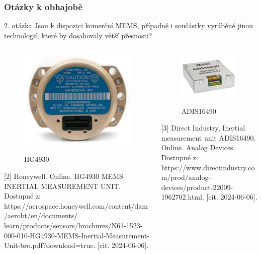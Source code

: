 \documentclass[%
  12pt,       				%
	t,                  %
	aspectratio=1610,   %
	unicode,						%
]{beamer}				    	%
\begin{document}
\begin{frame} 
	\frametitle{Otázky k obhajobě}
		\begin{alertblock}{2. otázka}
		Jsou k dispozici komerční MEMS, případně i součástky vyráběné jinou technologií, které by dosahovaly větší přesnosti?
		\end{alertblock}
		
		\begin{columns}[T] 								%
		\begin{column}{0.5\textwidth}		%
		\begin{figure}%
		\centering
		\includegraphics[width=0.5\columnwidth]{obrazky/HG4930}\par
		HG4930
		\end{figure}
		
		\tiny [2] Honeywell. Online. HG4930 MEMS INERTIAL MEASUREMENT UNIT. Dostupné z: https://aerospace.honeywell.com/content/dam/aerobt/en/documents/
		learn/products/sensors/brochures/N61-1523-000-010-HG4930-MEMS-Inertial-Measurement-Unit-bro.pdf?download=true. [cit. 2024-06-06].
		\end{column}
		\begin{column}{0.5\textwidth}		%
		\begin{figure}%
		\centering
		\includegraphics[width=0.7\columnwidth]{obrazky/ADIS16490}\par
		ADIS16490
		\end{figure}	
		
		\tiny [3] Direct Industry, Inertial measurement unit ADIS16490. Online. Analog Devices. Dostupné z: https://www.directindustry.com/prod/analog-devices/product-22009-1962702.html. [cit. 2024-06-06].
		
		
		\end{column}
		
	\end{columns}	

	
\end{frame} 
\end{document}
